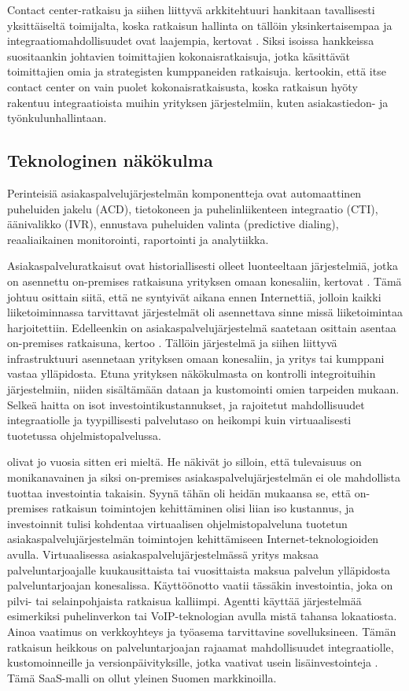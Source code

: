 \documentclass[finnish,12pt,a4paper,pdftex]{article}
\begin{document}
Contact center-ratkaisu ja siihen liittyvä arkkitehtuuri hankitaan tavallisesti yksittäiseltä toimijalta, koska ratkaisun hallinta on tällöin yksinkertaisempaa ja integraatiomahdollisuudet ovat laajempia, kertovat \cite{ccgartner}. Siksi isoissa hankkeissa suositaankin johtavien toimittajien kokonaisratkaisuja, jotka käsittävät toimittajien omia ja strategisten kumppaneiden ratkaisuja. \cite{bernier} kertookin, että itse contact center on vain puolet kokonaisratkaisusta, koska ratkaisun hyöty rakentuu integraatioista muihin yrityksen järjestelmiin, kuten asiakastiedon- ja työnkulunhallintaan.

\subsection{Teknologinen näkökulma} 

Perinteisiä asiakaspalvelujärjestelmän komponentteja ovat automaattinen puheluiden jakelu (ACD), tietokoneen ja puhelinliikenteen integraatio (CTI), äänivalikko (IVR), ennustava puheluiden valinta (predictive dialing), reaaliaikainen monitorointi, raportointi ja analytiikka.

Asiakaspalveluratkaisut ovat historiallisesti olleet luonteeltaan järjestelmiä, jotka on asennettu on-premises ratkaisuna yrityksen omaan konesaliin, kertovat \cite{vcc}. Tämä johtuu osittain siitä, että ne syntyivät aikana ennen Internettiä, jolloin kaikki liiketoiminnassa tarvittavat järjestelmät oli asennettava sinne missä liiketoimintaa harjoitettiin. Edelleenkin on asiakaspalvelujärjestelmä saatetaan osittain asentaa on-premises ratkaisuna, kertoo \cite{weiner}. Tällöin järjestelmä ja siihen liittyvä infrastruktuuri asennetaan yrityksen omaan konesaliin, ja yritys tai kumppani vastaa ylläpidosta. Etuna yrityksen näkökulmasta on kontrolli integroituihin järjestelmiin, niiden sisältämään dataan ja kustomointi omien tarpeiden mukaan. Selkeä haitta on isot investointikustannukset, ja rajoitetut mahdollisuudet integraatiolle ja tyypillisesti palvelutaso on heikompi kuin virtuaalisesti tuotetussa ohjelmistopalvelussa. 

\cite{vcc} olivat jo vuosia sitten eri mieltä. He näkivät jo silloin, että tulevaisuus on monikanavainen ja siksi on-premises asiakaspalvelujärjestelmän ei ole mahdollista tuottaa investointia takaisin. Syynä tähän oli heidän mukaansa se, että on-premises ratkaisun toimintojen kehittäminen olisi liian iso kustannus, ja investoinnit tulisi kohdentaa virtuaalisen ohjelmistopalveluna tuotetun asiakaspalvelujärjestelmän toimintojen kehittämiseen Internet-teknologioiden avulla. Virtuaalisessa asiakaspalvelujärjestelmässä yritys maksaa palveluntarjoajalle kuukausittaista tai vuosittaista maksua palvelun ylläpidosta palveluntarjoajan konesalissa. Käyttöönotto vaatii tässäkin investointia, joka on pilvi- tai selainpohjaista ratkaisua kalliimpi. Agentti käyttää järjestelmää esimerkiksi puhelinverkon tai VoIP-teknologian avulla mistä tahansa lokaatiosta. Ainoa vaatimus on verkkoyhteys ja työasema tarvittavine sovelluksineen. Tämän ratkaisun heikkous on palveluntarjoajan rajaamat  mahdollisuudet integraatiolle, kustomoinneille ja versionpäivityksille, jotka vaativat usein lisäinvestointeja \citep{talkdesk}. Tämä SaaS-malli on ollut yleinen Suomen markkinoilla.
\end{document}
